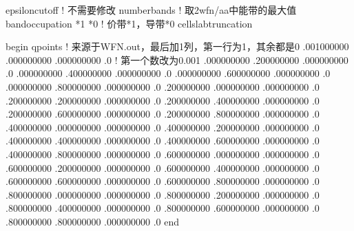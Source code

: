 \documentclass[a4paper,12pt,english]{sphinxmanual}
\begin{document}
\begin{sphinxVerbatim}[commandchars=\\\{\}]
epsilon\PYGZus{}cutoff           ! 不需要修改
number\PYGZus{}bands             ! 取2\PYGZhy{}wfn/aa中能带的最大值
band\PYGZus{}occupation *1 *0   ! 价带*1，导带*0
cell\PYGZus{}slab\PYGZus{}truncation

begin qpoints ! 来源于WFN.out，最后加1列，第一行为1，其余都是0
  .001000000  .000000000  .000000000   .0  ! 第一个数改为0.001
  .000000000  .200000000  .000000000   .0 
  .000000000  .400000000  .000000000   .0 
  .000000000  .600000000  .000000000   .0 
  .000000000  .800000000  .000000000   .0 
  .200000000  .000000000  .000000000   .0 
  .200000000  .200000000  .000000000   .0 
  .200000000  .400000000  .000000000   .0 
  .200000000  .600000000  .000000000   .0 
  .200000000  .800000000  .000000000   .0 
  .400000000  .000000000  .000000000   .0 
  .400000000  .200000000  .000000000   .0 
  .400000000  .400000000  .000000000   .0 
  .400000000  .600000000  .000000000   .0 
  .400000000  .800000000  .000000000   .0 
  .600000000  .000000000  .000000000   .0 
  .600000000  .200000000  .000000000   .0 
  .600000000  .400000000  .000000000   .0 
  .600000000  .600000000  .000000000   .0 
  .600000000  .800000000  .000000000   .0 
  .800000000  .000000000  .000000000   .0 
  .800000000  .200000000  .000000000   .0 
  .800000000  .400000000  .000000000   .0 
  .800000000  .600000000  .000000000   .0 
  .800000000  .800000000  .000000000   .0 
end
\end{sphinxVerbatim}
\end{document}
